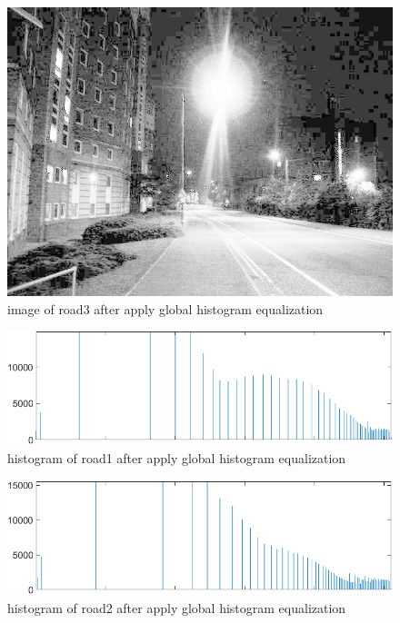 \documentclass[
	12pt, %
]{fphw}
\begin{document}
\begin{figure}[H]
 
	\centering
	\includegraphics[width=1\columnwidth]{T2/result/I3_global.jpg} 
	\caption{image of road3 after apply global histogram equalization}
	\label{fig12}
\end{figure}
\begin{figure}[H]
 
	\centering
	\includegraphics[width=1\columnwidth]{T2/result/hist1_global.png} 
	\caption{histogram of road1 after apply global histogram equalization}
	\label{fig13}
\end{figure}
\begin{figure}[H]
 
	\centering
	\includegraphics[width=1\columnwidth]{T2/result/hist2_global.png} 
	\caption{histogram of road2 after apply global histogram equalization}
	\label{fig14}
\end{figure}
\end{document}
